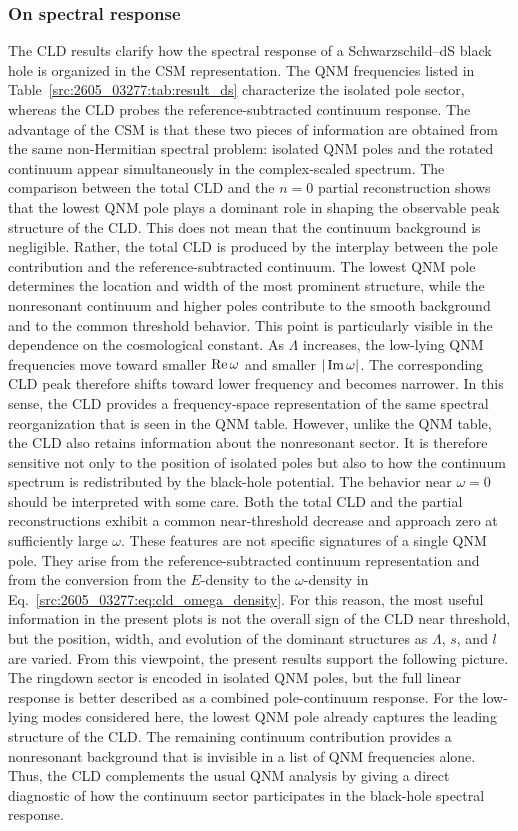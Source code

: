 \subsubsection{On spectral response}
The CLD results clarify how the spectral response of a Schwarzschild--dS
black hole is organized in the CSM representation.
The QNM frequencies listed in Table~\ref{src:2605_03277:tab:result_ds} characterize the
isolated pole sector, whereas the CLD probes the reference-subtracted
continuum response.
The advantage of the CSM is that these two pieces of information are obtained
from the same non-Hermitian spectral problem: isolated QNM poles and the
rotated continuum appear simultaneously in the complex-scaled spectrum.
The comparison between the total CLD and the $n=0$ partial reconstruction
shows that the lowest QNM pole plays a dominant role in shaping the
observable peak structure of the CLD.
This does not mean that the continuum background is negligible.
Rather, the total CLD is produced by the interplay between the pole
contribution and the reference-subtracted continuum.
The lowest QNM pole determines the location and width of the most prominent
structure, while the nonresonant continuum and higher poles contribute to the
smooth background and to the common threshold behavior.
This point is particularly visible in the dependence on the cosmological
constant.
As $\Lambda$ increases, the low-lying QNM frequencies move toward smaller
$\operatorname{Re}\omega$ and smaller $|\operatorname{Im}\omega|$.
The corresponding CLD peak therefore shifts toward lower frequency and
becomes narrower.
In this sense, the CLD provides a frequency-space representation of the same
spectral reorganization that is seen in the QNM table.
However, unlike the QNM table, the CLD also retains information about the
nonresonant sector.
It is therefore sensitive not only to the position of isolated poles but also
to how the continuum spectrum is redistributed by the black-hole potential.
The behavior near $\omega=0$ should be interpreted with some care.
Both the total CLD and the partial reconstructions exhibit a common
near-threshold decrease and approach zero at sufficiently large $\omega$.
These features are not specific signatures of a single QNM pole.
They arise from the reference-subtracted continuum representation and from
the conversion from the $E$-density to the $\omega$-density in
Eq.~\eqref{src:2605_03277:eq:cld_omega_density}.
For this reason, the most useful information in the present plots is not the
overall sign of the CLD near threshold, but the position, width, and
evolution of the dominant structures as $\Lambda$, $s$, and $l$ are varied.
From this viewpoint, the present results support the following picture.
The ringdown sector is encoded in isolated QNM poles, but the full linear
response is better described as a combined pole-continuum response.
For the low-lying modes considered here, the lowest QNM pole already captures
the leading structure of the CLD.
The remaining continuum contribution provides a nonresonant background that
is invisible in a list of QNM frequencies alone.
Thus, the CLD complements the usual QNM analysis by giving a direct diagnostic
of how the continuum sector participates in the black-hole spectral response.
